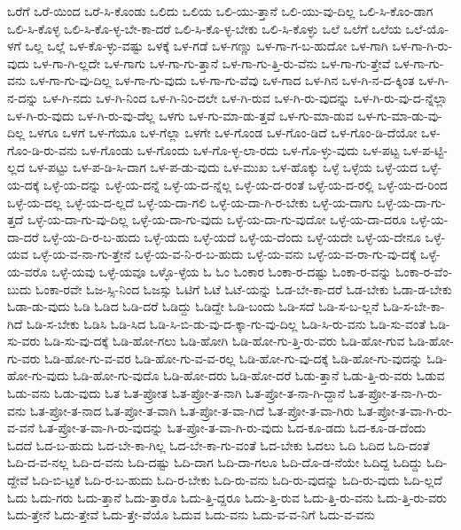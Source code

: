 {ಒರೆಗೆ
ಒರೆ-ಯಿಂದ
ಒರೆ-ಸಿ-ಕೊಂಡು
ಒಲಿದು
ಒಲಿಯ
ಒಲಿ-ಯು-ತ್ತಾನೆ
ಒಲಿ-ಯು-ವು-ದಿಲ್ಲ
ಒಲಿ-ಸಿ-ಕೊಂ-ಡಾಗ
ಒಲಿ-ಸಿ-ಕೊಳ್ಳ
ಒಲಿ-ಸಿ-ಕೊ-ಳ್ಳ-ಬೇ-ಕಾ-ದರೆ
ಒಲಿ-ಸಿ-ಕೊ-ಳ್ಳ-ಬೇಕು
ಒಲಿ-ಸಿ-ಕೊಳ್ಳು
ಒಲೆ
ಒಲೆಗೆ
ಒಲೆಯ
ಒಲೆ-ಯೊ-ಳಗೆ
ಒಲ್ಲ
ಒಲ್ಲೆ
ಒಳ-ಕೊ-ಳ್ಳು-ವಷ್ಟು
ಒಳಕ್ಕೆ
ಒಳ-ಗಡೆ
ಒಳ-ಗಣ್ಣು
ಒಳ-ಗಾ-ಗ-ಬ-ಹುದೋ
ಒಳ-ಗಾಗಿ
ಒಳ-ಗಾ-ಗಿ-ರು-ವುದು
ಒಳ-ಗಾ-ಗಿ-ಲ್ಲದೇ
ಒಳ-ಗಾಗು
ಒಳ-ಗಾ-ಗು-ತ್ತಾನೆ
ಒಳ-ಗಾ-ಗು-ತ್ತಿ-ರು-ವೆನು
ಒಳ-ಗಾ-ಗು-ತ್ತೇವೆ
ಒಳ-ಗಾ-ಗು-ವನು
ಒಳ-ಗಾ-ಗು-ವು-ದಿಲ್ಲ
ಒಳ-ಗಾ-ಗು-ವುದು
ಒಳ-ಗಾ-ಗು-ವೆವು
ಒಳ-ಗಾದ
ಒಳ-ಗಿನ
ಒಳ-ಗಿ-ನ-ದ-ಕ್ಕಿಂತ
ಒಳ-ಗಿ-ನ-ದನ್ನು
ಒಳ-ಗಿ-ನದು
ಒಳ-ಗಿ-ನಿಂದ
ಒಳ-ಗಿ-ನಿಂ-ದಲೇ
ಒಳ-ಗಿ-ರುವ
ಒಳ-ಗಿ-ರು-ವುದನ್ನು
ಒಳ-ಗಿ-ರು-ವು-ದ-ನ್ನೆಲ್ಲಾ
ಒಳ-ಗಿ-ರು-ವುದು
ಒಳ-ಗಿ-ರು-ವು-ದೆಲ್ಲ
ಒಳಗು
ಒಳ-ಗು-ಮಾ-ಡು-ತ್ತವೆ
ಒಳ-ಗು-ಮಾ-ಡುವ
ಒಳ-ಗು-ಮಾ-ಡು-ವು-ದಿಲ್ಲ
ಒಳಗೂ
ಒಳಗೆ
ಒಳ-ಗೆಯೂ
ಒಳ-ಗೆಲ್ಲಾ
ಒಳಗೇ
ಒಳ-ಗೊಂಡ
ಒಳ-ಗೊಂ-ಡಿದೆ
ಒಳ-ಗೊಂ-ಡಿ-ದೆಯೋ
ಒಳ-ಗೊಂ-ಡಿ-ರು-ವನು
ಒಳ-ಗೊಂಡು
ಒಳ-ಗೊಂದು
ಒಳ-ಗೊ-ಳ್ಳ-ಲಾ-ರದು
ಒಳ-ಗೊ-ಳ್ಳು-ವುದು
ಒಳ-ಪಟ್ಟ
ಒಳ-ಪ-ಟ್ಟಿ-ಲ್ಲದ
ಒಳ-ಪಟ್ಟು
ಒಳ-ಪ-ಡಿ-ಸಿ-ದಾಗ
ಒಳ-ಪ-ಡು-ವುದು
ಒಳ-ಮುಖ
ಒಳ-ಹೊಕ್ಕು
ಒಳ್ಳೆ
ಒಳ್ಳೆಯ
ಒಳ್ಳೆ-ಯದ
ಒಳ್ಳೆ-ಯ-ದಕ್ಕೆ
ಒಳ್ಳೆ-ಯ-ದನ್ನು
ಒಳ್ಳೆ-ಯ-ದನ್ನೆ
ಒಳ್ಳೆ-ಯ-ದ-ನ್ನೆಲ್ಲ
ಒಳ್ಳೆ-ಯ-ದ-ರಂತೆ
ಒಳ್ಳೆ-ಯ-ದ-ರಲ್ಲಿ
ಒಳ್ಳೆ-ಯ-ದ-ರಿಂದ
ಒಳ್ಳೆ-ಯ-ದಲ್ಲ
ಒಳ್ಳೆ-ಯ-ದ-ಲ್ಲದೆ
ಒಳ್ಳೆ-ಯ-ದಾ-ಗಲಿ
ಒಳ್ಳೆ-ಯ-ದಾ-ಗಿ-ರ-ಬೇಕು
ಒಳ್ಳೆ-ಯ-ದಾಗು
ಒಳ್ಳೆ-ಯ-ದಾ-ಗು-ತ್ತದೆ
ಒಳ್ಳೆ-ಯ-ದಾ-ಗು-ವು-ದಿಲ್ಲ
ಒಳ್ಳೆ-ಯ-ದಾ-ಗು-ವುದು
ಒಳ್ಳೆ-ಯ-ದಾ-ಗು-ವುದೋ
ಒಳ್ಳೆ-ಯ-ದಾ-ದರೂ
ಒಳ್ಳೆ-ಯ-ದಾ-ದರೆ
ಒಳ್ಳೆ-ಯ-ದಿ-ರ-ಬ-ಹುದು
ಒಳ್ಳೆ-ಯದು
ಒಳ್ಳೆ-ಯದೆ
ಒಳ್ಳೆ-ಯ-ದೆಂದು
ಒಳ್ಳೆ-ಯದೇ
ಒಳ್ಳೆ-ಯ-ದೇನೂ
ಒಳ್ಳೆ-ಯವ
ಒಳ್ಳೆ-ಯ-ವ-ನಾ-ಗು-ತ್ತೇನೆ
ಒಳ್ಳೆ-ಯ-ವ-ನಿ-ರ-ಬ-ಹುದು
ಒಳ್ಳೆ-ಯ-ವನು
ಒಳ್ಳೆ-ಯ-ವ-ರಾ-ಗು-ವು-ದಕ್ಕೆ
ಒಳ್ಳೆ-ಯ-ವರೊ
ಒಳ್ಳೆ-ಯವು
ಒಳ್ಳೆ-ಯವೂ
ಒಳ್ಳೊ-ಳ್ಳೆಯ
ಓ
ಓಂ
ಓಂಕಾರ
ಓಂಕಾ-ರ-ದಷ್ಟು
ಓಂಕಾ-ರ-ವನ್ನು
ಓಂಕಾ-ರ-ವೆಂ-ಬುದು
ಓಂಕಾ-ರವೇ
ಓಜ-ಸ್ಸಿ-ನಿಂದ
ಓಜಸ್ಸು
ಓಟಿಗೆ
ಓಟೆ
ಓಟೆ-ಯನ್ನು
ಓಡ-ಬೇ-ಕಾ-ದರೆ
ಓಡ-ಬೇಕು
ಓಡಾ-ಡ-ಬೇಕು
ಓಡಾ-ಡು-ವುದು
ಓಡಿ
ಓಡಿದ
ಓಡಿ-ದರೆ
ಓಡಿದ್ದು
ಓಡಿದ್ದೇ
ಓಡಿ-ಬಂದು
ಓಡಿ-ಸದೆ
ಓಡಿ-ಸ-ಬ-ಲ್ಲನೆ
ಓಡಿ-ಸ-ಬೇ-ಕಾ-ಗಿದೆ
ಓಡಿ-ಸ-ಬೇಕು
ಓಡಿಸಿ
ಓಡಿ-ಸಿದ
ಓಡಿ-ಸಿ-ಬಿ-ಡು-ವು-ದ-ಕ್ಕಾ-ಗು-ವು-ದಿಲ್ಲ
ಓಡಿ-ಸಿ-ರು-ವನು
ಓಡಿ-ಸು-ವಂತೆ
ಓಡಿ-ಸು-ವರು
ಓಡಿ-ಸು-ವು-ದಕ್ಕೆ
ಓಡಿ-ಹೋ-ಗಲು
ಓಡಿ-ಹೋಗಿ
ಓಡಿ-ಹೋ-ಗು-ತ್ತಿ-ರು-ವರು
ಓಡಿ-ಹೋ-ಗುವ
ಓಡಿ-ಹೋ-ಗು-ವರು
ಓಡಿ-ಹೋ-ಗು-ವ-ವರ
ಓಡಿ-ಹೋ-ಗು-ವ-ವ-ರಲ್ಲ
ಓಡಿ-ಹೋ-ಗು-ವು-ದಕ್ಕೆ
ಓಡಿ-ಹೋ-ಗು-ವುದನ್ನು
ಓಡಿ-ಹೋ-ಗು-ವುದು
ಓಡಿ-ಹೋ-ಗು-ವುದೊ
ಓಡಿ-ಹೋ-ದರು
ಓಡಿ-ಹೋ-ದರೆ
ಓಡು-ತ್ತಾನೆ
ಓಡು-ತ್ತಿ-ರು-ವರು
ಓಡುವ
ಓಡು-ವನು
ಓಡು-ವುದು
ಓತ
ಓತ-ಪ್ರೋತ
ಓತ-ಪ್ರೋ-ತ-ನಾಗಿ
ಓತ-ಪ್ರೋ-ತ-ನಾ-ಗಿ-ದ್ದಾನೆ
ಓತ-ಪ್ರೋ-ತ-ನಾ-ಗಿ-ರು-ವನು
ಓತ-ಪ್ರೋ-ತ-ನಾದ
ಓತ-ಪ್ರೋ-ತ-ವಾಗಿ
ಓತ-ಪ್ರೋ-ತ-ವಾ-ಗಿದೆ
ಓತ-ಪ್ರೋ-ತ-ವಾ-ಗಿರು
ಓತ-ಪ್ರೋ-ತ-ವಾ-ಗಿ-ರು-ವ-ವನೆ
ಓತ-ಪ್ರೋ-ತ-ವಾ-ಗಿ-ರು-ವುದನ್ನು
ಓತ-ಪ್ರೋ-ತ-ವಾ-ಗಿ-ರು-ವುದು
ಓದ-ಕೂ-ಡದು
ಓದ-ಕೂ-ಡ-ದೆಂದು
ಓದದೆ
ಓದ-ಬ-ಹುದು
ಓದ-ಬೇ-ಕಾ-ಗಿಲ್ಲ
ಓದ-ಬೇ-ಕಾ-ಗು-ವಂತೆ
ಓದ-ಬೇಕು
ಓದಲು
ಓದಿ
ಓದಿದ
ಓದಿ-ದಂತೆ
ಓದಿ-ದ-ವ-ನಲ್ಲ
ಓದಿ-ದ-ವನು
ಓದಿ-ದಷ್ಟು
ಓದಿ-ದಾಗ
ಓದಿ-ದಾ-ಗಲೂ
ಓದಿ-ದೊ-ಡ-ನೆಯೇ
ಓದಿದ್ದ
ಓದಿದ್ದು
ಓದಿ-ದ್ದೇವೆ
ಓದಿ-ಬಿ-ಟ್ಟಕೆ
ಓದಿ-ರ-ಬ-ಹುದು
ಓದಿ-ರ-ಬೇಕು
ಓದಿ-ರು-ವನು
ಓದಿ-ರು-ವುದನ್ನು
ಓದಿ-ರು-ವುದು
ಓದಿ-ಲ್ಲದೆ
ಓದು
ಓದು-ಗರು
ಓದು-ತ್ತಾನೆ
ಓದು-ತ್ತಾರೊ
ಓದು-ತ್ತಿ-ದ್ದರೂ
ಓದು-ತ್ತಿ-ರುವ
ಓದು-ತ್ತಿ-ರು-ವನು
ಓದು-ತ್ತಿ-ರು-ವರು
ಓದು-ತ್ತೇನೆ
ಓದು-ತ್ತೇವೆ
ಓದು-ತ್ತೇ-ವೆಯೊ
ಓದುವ
ಓದು-ವನು
ಓದು-ವ-ವ-ನಿಗೆ
ಓದು-ವ-ವನು
}
